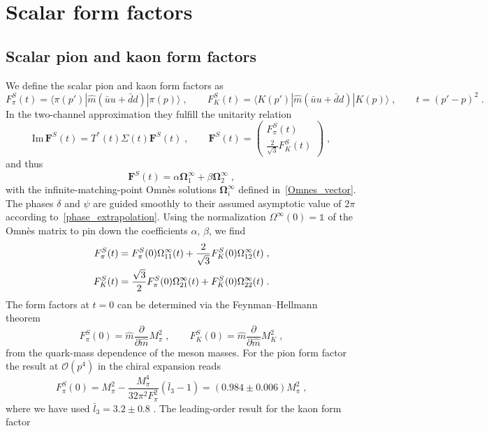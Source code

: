 \documentclass[11pt]{article}%
\providecommand{\ec}{\;,}
\providecommand{\ep}{\;.}
\providecommand{\nt}{\notag}
\newcommand{\mpi}{M_{\pi}}
\newcommand{\mK}{M_K}
\newcommand{\unity}{\mathds{1}}
\newcommand{\Fpi}{F_\pi}
\newcommand{\beq}{\begin{equation}}
\newcommand{\eeq}{\end{equation}}
\newcommand{\Order}{\mathcal{O}}
\renewcommand{\Im}{\text{Im}\,}
\providecommand{\unity}{\mathds{1}}
\begin{document}
\section{Scalar form factors}
\label{sec:SFF}

\subsection{Scalar pion and kaon form factors}

We define the scalar pion and kaon form factors as
\beq
F^S_\pi(t)=\langle \pi(p')|\hat m(\bar u u+\bar d d)|\pi(p)\rangle\ec\qquad F^S_K(t)=\langle K(p')|\hat m(\bar u u+\bar d d)|K(p)\rangle\ec\qquad t=(p'-p)^2\ep
\eeq
In the two-channel approximation they fulfill the unitarity relation~\cite{DGL90}
\beq
\Im\mathbf{F}^S(t)=T^*(t)\Sigma(t)\mathbf{F}^S(t)\ec\qquad \mathbf{F}^S(t)=\begin{pmatrix}
                                                                                  F^S_\pi(t)\\ \frac{2}{\sqrt{3}}F^S_K(t)
                                                                                 \end{pmatrix}\ec
\eeq
and thus
\beq
\mathbf{F}^S(t)=\alpha \mathbf{\Omega}_1^\infty+\beta \mathbf{\Omega}_2^\infty\ec
\eeq
with the infinite-matching-point Omn\`es solutions $\mathbf{\Omega}_i^\infty$  defined in~\eqref{Omnes_vector}. The phases $\delta$ and $\psi$ are guided smoothly to their assumed asymptotic value of $2\pi$ according to~\eqref{phase_extrapolation}. Using the normalization $\Omega^\infty(0)=\unity$ of the Omn\`es matrix to pin down the coefficients $\alpha$, $\beta$, we find
\begin{align}
\label{SFF_Omnes}
 F^S_\pi(t)&=F^S_\pi(0)\Omega_{11}^\infty(t)+\frac{2}{\sqrt{3}}F^S_K(0)\Omega_{12}^\infty(t)\ec\nt\\
F^S_K(t)&=\frac{\sqrt{3}}{2}F^S_\pi(0)\Omega_{21}^\infty(t)+F^S_K(0)\Omega_{22}^\infty(t)\ep
\end{align}
The form factors at $t=0$ can be determined via the Feynman--Hellmann theorem~\cite{Hellmann,Feynman}
\beq
F^S_\pi(0)=\hat m\frac{\partial}{\partial \hat m}\mpi^2\ec\qquad
F^S_K(0)=\hat m\frac{\partial}{\partial \hat m}\mK^2\ec
\eeq 
from the quark-mass dependence of the meson masses. For the pion form factor the result at $\Order(p^4)$ in the chiral expansion reads~\cite{GL84}
\beq
F^S_\pi(0)=\mpi^2-\frac{\mpi^4}{32\pi^2\Fpi^2}(\bar l_3-1)=(0.984\pm0.006)\mpi^2\ec
\eeq 
where we have used $\bar l_3=3.2\pm 0.8$ \cite{FLAG}. The leading-order result for the kaon form factor
\end{document}
